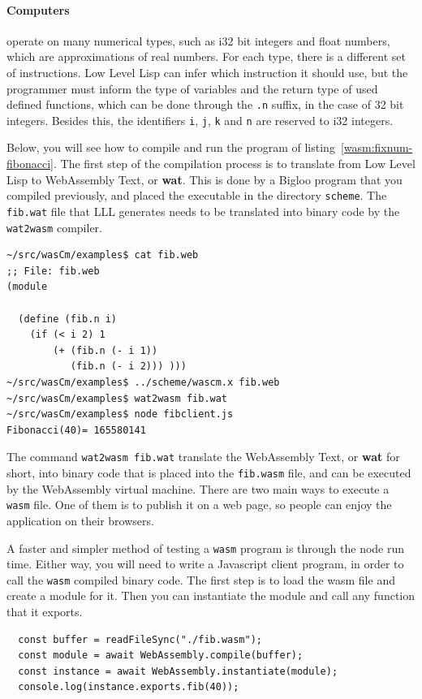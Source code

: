 \documentclass[a4paper,12pt]{book}
\begin{document}
\paragraph{Computers} operate on many numerical types,
such as i32 bit integers and float numbers, which are
approximations of real numbers. For each type, there is
a different set of instructions. Low Level Lisp can infer
which instruction it should use, but the programmer must
inform the type of variables and the return type
of used defined functions, which can be done through
the \verb|.n| suffix, in the case of 32 bit integers.
Besides this, the identifiers \verb|i|, \verb|j|,
\verb|k| and \verb|n| are reserved to i32 integers.

Below, you will see how to compile and run the
program of listing~\ref{wasm:fixnum-fibonacci}.
The first step of the compilation process is to
translate from Low Level Lisp to WebAssembly Text,
or {\bf wat}. This is done by a Bigloo program that
you compiled previously, and placed the executable
in the directory \verb|scheme|. The \verb|fib.wat|
file that LLL generates needs to be translated into
binary code by the \verb|wat2wasm| compiler.
\begin{verbatim}
~/src/wasCm/examples$ cat fib.web
;; File: fib.web
(module

  (define (fib.n i)
    (if (< i 2) 1
        (+ (fib.n (- i 1))
           (fib.n (- i 2))) )))
~/src/wasCm/examples$ ../scheme/wascm.x fib.web
~/src/wasCm/examples$ wat2wasm fib.wat
~/src/wasCm/examples$ node fibclient.js
Fibonacci(40)= 165580141
\end{verbatim}

The command \verb|wat2wasm fib.wat| translate the
WebAssembly Text, or {\bf wat} for short, into binary
code that is placed into the \verb|fib.wasm| file, and
can be executed by the WebAssembly virtual
machine. There are two main ways
to execute a \verb|wasm| file. One of them is to
publish it on a web page, so people can enjoy the
application on their browsers.

A faster and simpler method of testing a \verb|wasm|
program is through the node run time. Either way, you
will need to write a Javascript client program, in
order to call the \verb|wasm| compiled binary code.
The first step is to load the wasm file and create a
module for it. Then you can instantiate the module
and call any function that it exports.
\begin{verbatim}
  const buffer = readFileSync("./fib.wasm");
  const module = await WebAssembly.compile(buffer);
  const instance = await WebAssembly.instantiate(module);
  console.log(instance.exports.fib(40));
\end{verbatim}
\end{document}
